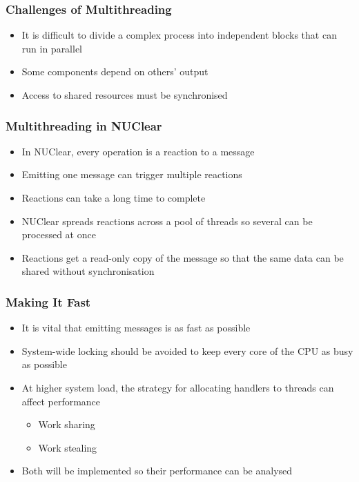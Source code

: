 \documentclass{beamer}
\begin{document}
	\begin{frame}
		\frametitle{Challenges of Multithreading}
		
		\begin{itemize}
			\item It is difficult to divide a complex process into independent blocks that can run in parallel
			\item Some components depend on others' output
			\item Access to shared resources must be synchronised
		\end{itemize}
	\end{frame}
	
	\begin{frame}
		\frametitle{Multithreading in NUClear}
		
		\begin{itemize}
			\item In NUClear, every operation is a reaction to a message
			\item Emitting one message can trigger multiple reactions
			\item Reactions can take a long time to complete
			\item NUClear spreads reactions across a pool of threads so several can be processed at once
			\item Reactions get a read-only copy of the message so that the same data can be shared without synchronisation
		\end{itemize}
	\end{frame}
	
	\begin{frame}
		\frametitle{Making It Fast}
		
		\begin{itemize}
			\item It is vital that emitting messages is as fast as possible
			\item System-wide locking should be avoided to keep every core of the CPU as busy as possible
			\item At higher system load, the strategy for allocating handlers to threads can affect performance
			\begin{itemize}
				\item Work sharing
				\item Work stealing
			\end{itemize}
			\item Both will be implemented so their performance can be analysed
		\end{itemize}
	\end{frame}
	
\end{document}
